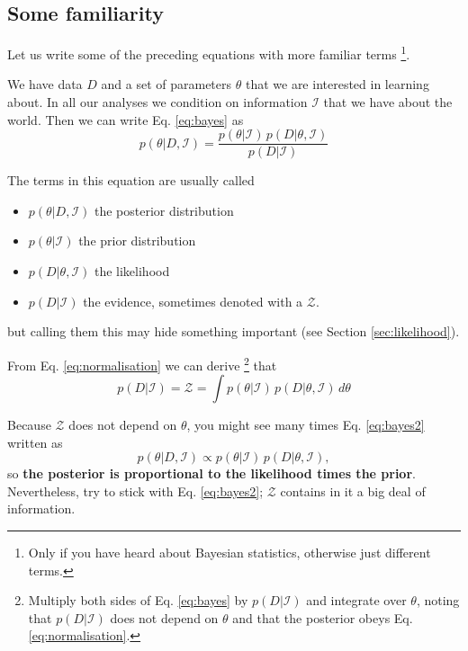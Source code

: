 \documentclass[a4paper,11pt]{article}
\begin{document}
\subsection{Some familiarity}

Let us write some of the preceding equations with more familiar terms%
\footnote{Only if you have heard about Bayesian statistics, otherwise just different terms.}.

\noindent We have data $D$ and a set of parameters $\theta$ that we are interested in learning about. 
In all our analyses we condition on information $\mathcal{I}$ that we have about the world.
Then we can write Eq. \eqref{eq:bayes} as
%
\begin{equation}\label{eq:bayes2}
  p(\theta|D,\mathcal{I}) = \frac{p(\theta|\mathcal{I}) \, p(D|\theta,\mathcal{I})}{p(D|\mathcal{I})}
\end{equation}

The terms in this equation are usually called
%
\begin{itemize}
   \item[] $p(\theta|D,\mathcal{I})$ the posterior distribution
   \item[] $p(\theta|\mathcal{I})$ the prior distribution
   \item[] $p(D|\theta,\mathcal{I})$ the likelihood
   \item[] $p(D|\mathcal{I})$ the evidence, sometimes denoted with a $\mathcal{Z}$.
\end{itemize}
%
but calling them this may hide something important (see Section \ref{sec:likelihood}).

From Eq. \eqref{eq:normalisation} we can derive%
\footnote{Multiply both sides of Eq. \eqref{eq:bayes} by $p(D|\mathcal{I})$ and integrate over $\theta$, noting that $p(D|\mathcal{I})$ does not depend on $\theta$ and that the posterior obeys Eq. \eqref{eq:normalisation}.}
that
%
\begin{equation}
   p(D|\mathcal{I}) = \mathcal{Z} = \int p(\theta|\mathcal{I}) \, p(D|\theta,\mathcal{I}) \, d\theta
\end{equation}
%

Because $\mathcal{Z}$ does not depend on $\theta$, you might see many times Eq. \eqref{eq:bayes2} written as
%
\begin{equation}\label{eq:propto}
   p(\theta|D,\mathcal{I}) \propto p(\theta|\mathcal{I}) \, p(D|\theta,\mathcal{I}) ,
\end{equation}
%
so \textbf{the posterior is proportional to the likelihood times the prior}.
Nevertheless, try to stick with Eq. \eqref{eq:bayes2}; $\mathcal{Z}$ contains in it a big deal of information.
\end{document}
